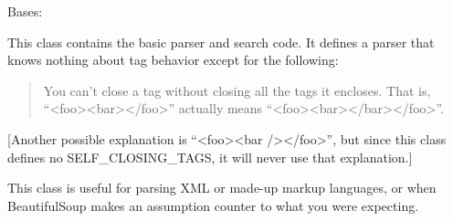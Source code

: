 \documentclass[letterpaper,10pt,english]{sphinxmanual}
\begin{document}

\begin{fulllineitems}
\label{SamPy.parsing:SamPy.parsing.BeautifulSoup.BeautifulStoneSoup}
Bases: {\hyperref[SamPy.parsing:SamPy.parsing.BeautifulSoup.Tag]{}}

This class contains the basic parser and search code. It defines
a parser that knows nothing about tag behavior except for the
following:
\begin{quote}

You can't close a tag without closing all the tags it encloses.
That is, ``\textless{}foo\textgreater{}\textless{}bar\textgreater{}\textless{}/foo\textgreater{}'' actually means
``\textless{}foo\textgreater{}\textless{}bar\textgreater{}\textless{}/bar\textgreater{}\textless{}/foo\textgreater{}''.
\end{quote}

{[}Another possible explanation is ``\textless{}foo\textgreater{}\textless{}bar /\textgreater{}\textless{}/foo\textgreater{}'', but since
this class defines no SELF\_CLOSING\_TAGS, it will never use that
explanation.{]}

This class is useful for parsing XML or made-up markup languages,
or when BeautifulSoup makes an assumption counter to what you were
expecting.


\begin{fulllineitems}
\label{SamPy.parsing:SamPy.parsing.BeautifulSoup.BeautifulStoneSoup.endData}
\end{fulllineitems}



\begin{fulllineitems}
\label{SamPy.parsing:SamPy.parsing.BeautifulSoup.BeautifulStoneSoup.extractCharsetFromMeta}
\end{fulllineitems}



\end{fulllineitems}
\end{document}

